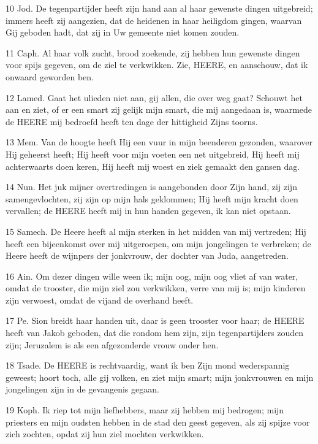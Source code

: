 \par 10 Jod. De tegenpartijder heeft zijn hand aan al haar gewenste dingen uitgebreid; immers heeft zij aangezien, dat de heidenen in haar heiligdom gingen, waarvan Gij geboden hadt, dat zij in Uw gemeente niet komen zouden.
\par 11 Caph. Al haar volk zucht, brood zoekende, zij hebben hun gewenste dingen voor spijs gegeven, om de ziel te verkwikken. Zie, HEERE, en aanschouw, dat ik onwaard geworden ben.
\par 12 Lamed. Gaat het ulieden niet aan, gij allen, die over weg gaat? Schouwt het aan en ziet, of er een smart zij gelijk mijn smart, die mij aangedaan is, waarmede de HEERE mij bedroefd heeft ten dage der hittigheid Zijns toorns.
\par 13 Mem. Van de hoogte heeft Hij een vuur in mijn beenderen gezonden, waarover Hij geheerst heeft; Hij heeft voor mijn voeten een net uitgebreid, Hij heeft mij achterwaarts doen keren, Hij heeft mij woest en ziek gemaakt den gansen dag.
\par 14 Nun. Het juk mijner overtredingen is aangebonden door Zijn hand, zij zijn samengevlochten, zij zijn op mijn hals geklommen; Hij heeft mijn kracht doen vervallen; de HEERE heeft mij in hun handen gegeven, ik kan niet opstaan.
\par 15 Samech. De Heere heeft al mijn sterken in het midden van mij vertreden; Hij heeft een bijeenkomst over mij uitgeroepen, om mijn jongelingen te verbreken; de Heere heeft de wijnpers der jonkvrouw, der dochter van Juda, aangetreden.
\par 16 Ain. Om dezer dingen wille ween ik; mijn oog, mijn oog vliet af van water, omdat de trooster, die mijn ziel zou verkwikken, verre van mij is; mijn kinderen zijn verwoest, omdat de vijand de overhand heeft.
\par 17 Pe. Sion breidt haar handen uit, daar is geen trooster voor haar; de HEERE heeft van Jakob geboden, dat die rondom hem zijn, zijn tegenpartijders zouden zijn; Jeruzalem is als een afgezonderde vrouw onder hen.
\par 18 Tsade. De HEERE is rechtvaardig, want ik ben Zijn mond wederspannig geweest; hoort toch, alle gij volken, en ziet mijn smart; mijn jonkvrouwen en mijn jongelingen zijn in de gevangenis gegaan.
\par 19 Koph. Ik riep tot mijn liefhebbers, maar zij hebben mij bedrogen; mijn priesters en mijn oudsten hebben in de stad den geest gegeven, als zij spijze voor zich zochten, opdat zij hun ziel mochten verkwikken.
